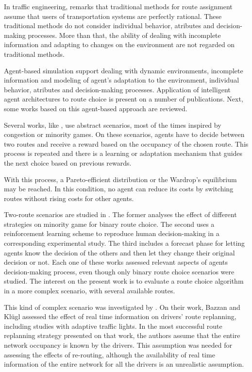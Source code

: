 \documentclass[12pt]{llncs}
\begin{document}
In traffic engineering, \cite{Bazzan&Kluegl2007} remarks that traditional methods for route assignment assume that users of transportation systems are perfectly rational. These traditional methods do not consider individual behavior, atributes and decision-making processes. More than that, the ability of dealing with incomplete information and adapting to changes on the environment are not regarded on traditional methods.

Agent-based simulation support dealing with dynamic environments, incomplete information and modeling of agent's adaptation to the environment, individual behavior, atributes and decision-making processes. Application of intelligent agent architectures to route choice is present on a number of publications. Next, some works based on this agent-based approach are reviewed.

Several works, like \cite{Bazzan+2000icmas, Chmura&Pitz2007, Kluegl&Bazzan2004}, use abstract scenarios, most of the times inspired by congestion or minority games. On these scenarios, agents have to decide between two routes and receive a reward based on the occupancy of the chosen route. This process is repeated and there is a learning or adaptation mechanism that guides the next choice based on previous rewards.

With this process, a Pareto-efficient distribution or the Wardrop's equilibrium \cite{Wardrop1952} may be reached. In this condition, no agent can reduce its costs by switching routes without rising costs for other agents. 

Two-route scenarios are studied in \cite{Bazzan+2000icmas, Chmura&Pitz2007, Kluegl&Bazzan2004}. The former analyses the effect of different strategies on minority game for binary route choice. The second uses a reinforcement learning scheme to reproduce human decision-making in a corresponding experimental study. The third includes a forecast phase for letting agents know the decision of the others and then let they change their original decision or not. Each one of these works assessed relevant aspects of agents decision-making process, even though only binary route choice scenarios were studied. The interest on the present work is to evaluate a route choice algorithm in a more complex scenario, with several available routes.

This kind of complex scenario was investigated by \cite{Bazzan&Kluegl2008}. On their work, Bazzan and Kl\"ugl assessed the effect of real time information on drivers' route replanning, including studies with adaptive traffic lights. In the most successful route replanning strategy presented on that work, the authors assume that the entire network occupancy is known by the drivers. This assumption was needed for assessing the effects of re-routing, although the availability of real time information of the entire network for all the drivers is an unrealistic assumption.
\end{document}
